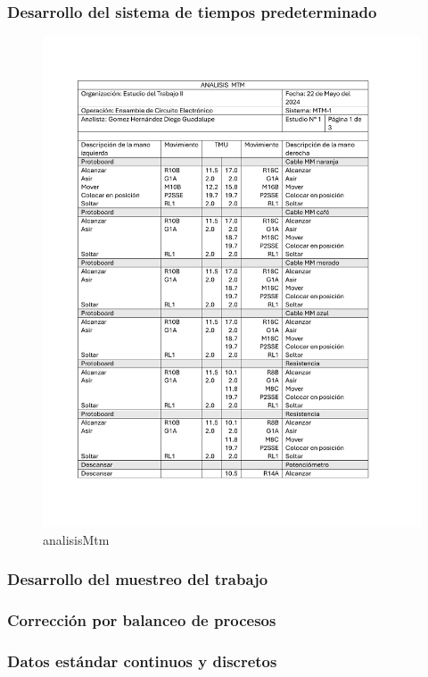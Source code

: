     \subsubsection{Desarrollo del sistema de tiempos predeterminado}
    \begin{figure}[H]
        \centering
        \includegraphics[scale=0.40]{13/img/analisisMtm.pdf}
        \caption{analisisMtm}
        \label{fig:analisisMtm}
    \end{figure}
    \subsubsection{Desarrollo del muestreo del trabajo}
    \subsubsection{Corrección por balanceo de procesos}
    \subsubsection{Datos estándar continuos y discretos}
